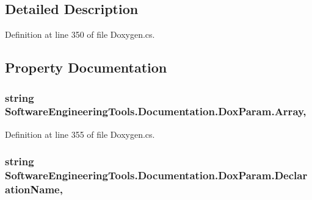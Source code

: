 \subsection{Detailed Description}


Definition at line 350 of file Doxygen.\+cs.



\subsection{Property Documentation}
\hypertarget{class_software_engineering_tools_1_1_documentation_1_1_dox_param_a50b5bfe18375627cba43878c9de316d1}{
\subsubsection[{Array}]{\setlength{\rightskip}{0pt plus 5cm}string Software\+Engineering\+Tools.\+Documentation.\+Dox\+Param.\+Array\hspace{0.3cm}{\ttfamily [get]}, {\ttfamily [set]}}}\label{class_software_engineering_tools_1_1_documentation_1_1_dox_param_a50b5bfe18375627cba43878c9de316d1}


Definition at line 355 of file Doxygen.\+cs.

\hypertarget{class_software_engineering_tools_1_1_documentation_1_1_dox_param_aa4851129748220e1e62634c7b9468621}{
\subsubsection[{Declaration\+Name}]{\setlength{\rightskip}{0pt plus 5cm}string Software\+Engineering\+Tools.\+Documentation.\+Dox\+Param.\+Declaration\+Name\hspace{0.3cm}{\ttfamily [get]}, {\ttfamily [set]}}}\label{class_software_engineering_tools_1_1_documentation_1_1_dox_param_aa4851129748220e1e62634c7b9468621}


